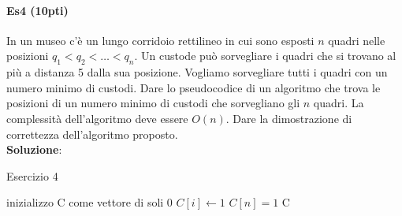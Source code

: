 \paragraph{Es4 (10pti)}
In un museo c'è un lungo corridoio rettilineo in cui sono esposti $n$ quadri nelle posizioni $q_{1} < q_{2} < \ldots < q_{n}$. Un custode può sorvegliare i quadri che si trovano al più a distanza 5 dalla sua posizione. Vogliamo sorvegliare tutti i quadri con un numero minimo di custodi. Dare lo pseudocodice di un algoritmo che trova le posizioni di un numero minimo di custodi che sorvegliano gli $n$ quadri. La complessità dell'algoritmo deve essere $O(n)$. Dare la dimostrazione di correttezza dell'algoritmo proposto. \\
\textbf{Soluzione}:
\begin{algorithm}
	\caption{Esercizio 4}\label{alg:es4}
	\begin{algorithmic}[1]
			\State inizializzo C come vettore di soli 0
					\State $C[i] \gets 1$
				\EndIf
			\EndFor
				\State $C[n] = 1$
			\EndIf
			\State \Return C
		\EndFunction
	\end{algorithmic}
\end{algorithm} \\ \hfill